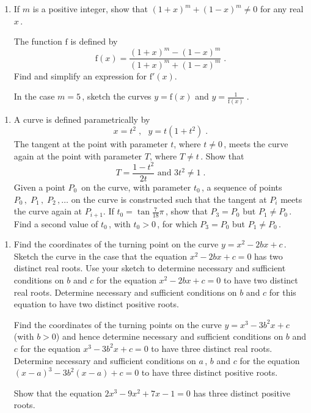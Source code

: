\documentclass[a4, 11pt]{report}
\newlength{\qspace}
\newcounter{qnumber}
\newenvironment{question}%
 {\vspace{\qspace}
  \begin{enumerate}[\bfseries 1\quad][10]%
    \setcounter{enumi}{\value{qnumber}}%
    \item%
 }
{
  \end{enumerate}
  \filbreak
  \stepcounter{qnumber}
 }
\def\f{{\mathrm f}}
\def\l{\left(}
\def\r{\right)}
\begin{document}
\begin{question}
If $m$ is a positive integer,    
show that $\l 1+x \r^m + \l 1-x \r^m \ne 0$ for any real $x\,$.   
   
The function $\f$ is defined by   
\[   
\f (x) = \frac{ (1+x )^m - ( 1-x )^m}{ (1+x )^m + (1-x )^m}   
\;.   
\]   
Find and simplify an expression for $\f'(x)$.   
   
In the case $m=5\,$,   
sketch the curves    
$y = \f (x)$ and  $\displaystyle y = \frac1 { \f (x )}\;$. 
\end{question}

\begin{question}
A curve is defined parametrically by   
\[   
x=t^2 \;, \ \ \    
y=t (1 + t^2 )   
\;.   
\]   
The tangent at the  point with parameter $t$, where $t\ne0\,$, meets the    
curve again at the point with parameter $T$, where $T\ne t\,$. Show that   
\[   
T = \frac{1 - t^2 }{2t} \mbox { \ \ \ and \ \ \ } 3t^2\ne 1\;.   
\]   
Given a point $P_0\,$ on the curve, with parameter $t_0\,$,    
a sequence of points $P_0 \, , \; P_1 \, , \; P_2 \, , \ldots$    
on the curve is constructed such that the tangent at $P_i$ meets    
the curve again at $P_{i+1}$. If $t_0 = \tan \frac{ 7 } {18}\pi\,$,    
show that $P_3 = P_0$ but $P_1\ne P_0\,$.    
Find a second value of $t_0\,$, with $t_0>0\,$,   
for which $P_3 = P_0$ but  $P_1\ne P_0\,$.   
\end{question}

\begin{question}
Find the coordinates of the turning point on the curve $y = x^2 - 2bx + c\,$.   
 Sketch the curve in the case that the equation $x^2 - 2bx + c=0$ has two    
distinct real roots. Use your sketch to determine necessary and sufficient   
conditions on $b$ and $c$ for the equation $x^2 - 2bx + c = 0$    
to have two distinct real roots. Determine   
necessary and sufficient   
conditions on $b$ and $c$ for this equation to have two distinct positive roots.   
   
Find the coordinates of the turning points on the curve    
$y = x^3 - 3b^2x + c$ (with $b>0$) and hence determine necessary and sufficient   
conditions on $b$ and $c$ for the equation $x^3 - 3b^2x + c = 0$    
to have three distinct real roots. Determine necessary and sufficient   
conditions on $a\,$, $b$ and $c$ for the equation    
$\l x - a \r^3 - 3b^2 \l x - a \r + c = 0$ to have three distinct positive roots.   
   
Show that the equation $2x^3 - 9x^2 + 7x - 1 = 0$ has three distinct positive roots.   
	\end{question}
	
\end{document}
